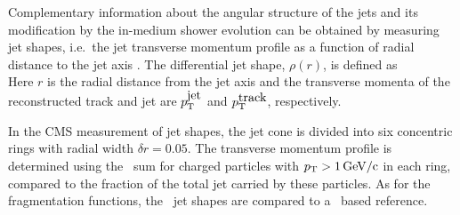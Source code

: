 Complementary information about the angular structure of the jets and its modification
by the in-medium shower evolution can be obtained by measuring jet shapes, i.e.\ the 
jet transverse momentum profile as a function of radial distance to the jet axis
\cite{MehtarTani:2010ma,Idilbi:2008vm,CasalderreySolana:2011rz,CasalderreySolana:2011rq,Neufeld:2011yh,Blaizot:2012fh,Fickinger:2013xwa}. 
The differential jet shape, $\rho(r)$, is defined as
\begin{equation}
\label{eq:rho(r)}
\end{equation}
Here $r$ is the radial distance from the jet axis
and the transverse momenta of the reconstructed track and jet are 
$p_{\rm{T}}^{\mbox{jet}}$ and $p_{\rm{T}}^{\mbox{track}}$, respectively.

In the CMS measurement of jet shapes, the jet cone is divided into six concentric rings 
with radial width $\delta r = 0.05$. The transverse momentum profile is determined using
the \pt\ sum for charged particles with $p_{\rm{T}} > 1\,\mathrm{GeV/c}$ in each ring, compared to 
the fraction of the total jet \pt carried by these particles. As for the fragmentation
functions, the \PbPb\ jet shapes are compared to a \pp\ based reference.

